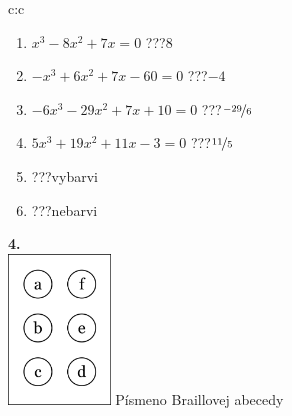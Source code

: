 \documentclass[10pt]{report}
\begin{document}
\begin{tabular}{c:c}
\begin{minipage}[c][104.5mm][t]{0.5\linewidth}
\begin{center}
\begin{minipage}{0.79\linewidth}
\begin{center}
\begin{varwidth}{\linewidth}
\begin{enumerate}
\Large
\item $x^3-8x^2+7x=0$\quad \dotfill\; ???\;\dotfill \quad $8$
\item $-x^3+6x^2+7x-60=0$\quad \dotfill\; ???\;\dotfill \quad $-4$
\item $-6x^3-29x^2+7x+10=0$\quad \dotfill\; ???\;\dotfill \quad $\nicefrac{-29}{6}$
\item $5x^3+19x^2+11x-3=0$\quad \dotfill\; ???\;\dotfill \quad $\nicefrac{11}{5}$
\item \quad \dotfill\; ???\;\dotfill \quad vybarvi
\item \quad \dotfill\; ???\;\dotfill \quad nebarvi
\end{enumerate}
\end{varwidth}
\end{center}
\end{minipage}
\begin{minipage}{0.20\linewidth}
\begin{center}
{\Huge\bfseries 4.} \\[2mm]
\includegraphics[height=40mm]{../images/braille.png}
{\small Písmeno Braillovej abecedy}
\end{center}
\end{minipage}
\end{center}
\end{minipage}
%
\end{tabular}
\newpage
\thispagestyle{empty}
\end{document}

